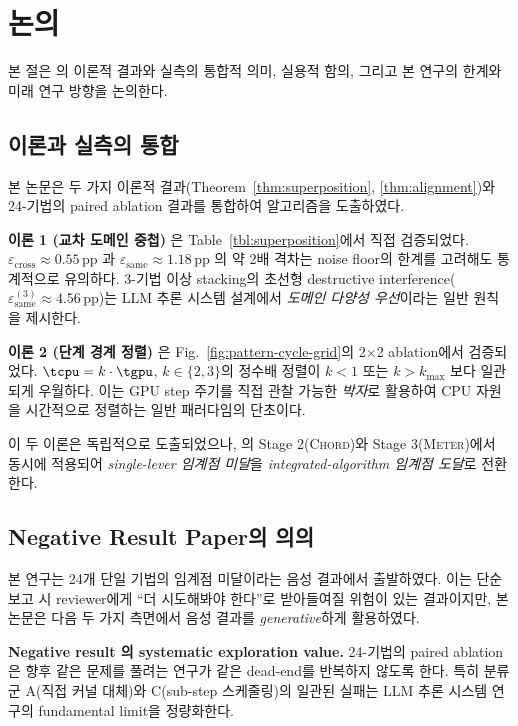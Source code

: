 
\section{논의}
\label{sec:discussion}

본 절은 \algname 의 이론적 결과와 실측의 통합적 의미, 실용적 함의, 그리고 본 연구의 한계와 미래 연구 방향을 논의한다.

\subsection{이론과 실측의 통합}

본 논문은 두 가지 이론적 결과(Theorem~\ref{thm:superposition}, \ref{thm:alignment})와 24-기법의 paired ablation 결과를 통합하여 \algname 알고리즘을 도출하였다.

\textbf{이론 1 (교차 도메인 중첩)} 은 Table~\ref{tbl:superposition}에서 직접 검증되었다.
$\varepsilon_{\text{cross}} \approx 0.55$\,pp 과 $\varepsilon_{\text{same}} \approx 1.18$\,pp 의 약 2배 격차는 noise floor의 한계를 고려해도 통계적으로 유의하다.
3-기법 이상 stacking의 초선형 destructive interference($\varepsilon_{\text{same}}^{(3)} \approx 4.56$\,pp)는 LLM 추론 시스템 설계에서 \emph{도메인 다양성 우선}이라는 일반 원칙을 제시한다.

\textbf{이론 2 (단계 경계 정렬)} 은 Fig.~\ref{fig:pattern-cycle-grid}의 2$\times$2 ablation에서 검증되었다.
$\tcpu = k \cdot \tgpu$, $k \in \{2, 3\}$의 정수배 정렬이 $k < 1$ 또는 $k > k_{\max}$ 보다 일관되게 우월하다.
이는 GPU step 주기를 직접 관찰 가능한 \emph{박자}로 활용하여 CPU 자원을 시간적으로 정렬하는 일반 패러다임의 단초이다.

이 두 이론은 독립적으로 도출되었으나, \algname 의 Stage 2(\textsc{Chord})와 Stage 3(\textsc{Meter})에서 동시에 적용되어 \emph{single-lever 임계점 미달}을 \emph{integrated-algorithm 임계점 도달}로 전환한다.

\subsection{Negative Result Paper의 의의}

본 연구는 24개 단일 기법의 임계점 미달이라는 음성 결과에서 출발하였다.
이는 단순 보고 시 reviewer에게 ``더 시도해봐야 한다''로 받아들여질 위험이 있는 결과이지만, 본 논문은 다음 두 가지 측면에서 음성 결과를 \emph{generative}하게 활용하였다.

\textbf{Negative result 의 systematic exploration value.}
24-기법의 paired ablation은 향후 같은 문제를 풀려는 연구가 같은 dead-end를 반복하지 않도록 한다.
특히 분류군 A(직접 커널 대체)와 C(sub-step 스케줄링)의 일관된 실패는 LLM 추론 시스템 연구의 fundamental limit을 정량화한다.

